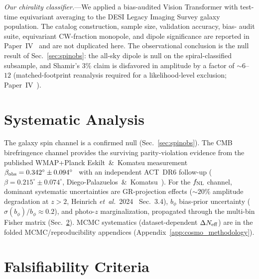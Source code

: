\documentclass[aps,prd,twocolumn,superscriptaddress,showpacs,preprintnumbers,nofootinbib,longbibliography,floatfix]{revtex4-2}
\newcommand{\Neff}{N_{\rm eff}}
\newcommand{\etal}{\textit{et~al.}}
\newcommand{\fnl}{f_{\rm NL}}
\begin{document}
\textit{Our chirality classifier.}---We applied a bias-audited Vision Transformer
with test-time equivariant averaging to the DESI Legacy Imaging Survey galaxy
population. The catalog construction, sample size, validation accuracy, bias-
audit suite, equivariant CW-fraction monopole, and dipole significance are
reported in Paper~IV~\cite{Golden2026P4} and are not duplicated here. The
observational conclusion is the null result of Sec.~\ref{sec:spinobs}: the
all-sky dipole is null on the spiral-classified subsample, and Shamir's
$3\%$ claim is disfavored in amplitude by a factor of $\sim\!6$--$12$
(matched-footprint reanalysis required for a likelihood-level exclusion;
Paper~IV~\cite{Golden2026P4}).


\section{Systematic Analysis}\label{sec:systematics}
The galaxy spin channel is a confirmed null (Sec.~\ref{sec:spinobs}). The CMB
birefringence channel provides the surviving parity-violation evidence from
the published WMAP+Planck Eskilt~\&~Komatsu measurement
$\beta_{\rm obs} = 0.342^\circ \pm 0.094^\circ$~\cite{Eskilt2022} with an
independent ACT~DR6 follow-up
($\beta = 0.215^\circ \pm 0.074^\circ$, Diego-Palazuelos~\&~Komatsu~\cite{DiegoPalazuelos2025}).
For the $\fnl$ channel, dominant systematic
uncertainties are GR-projection effects (${\sim}20\%$ amplitude degradation at
$z>2$, Heinrich \etal~2024~\cite{Heinrich:2023} Sec.~3.4), $b_\phi$ bias-prior uncertainty ($\sigma(b_\phi)/b_\phi\approx 0.2$),
and photo-$z$ marginalization, propagated through the multi-bin Fisher matrix
(Sec.~\ref{sec:falsification}). MCMC systematics (dataset-dependent $\Delta\Neff$)
are in the folded MCMC/reproducibility appendices (Appendix~\ref{app:cosmo_methodology}).


\section{Falsifiability Criteria}\label{sec:falsification}
\end{document}
